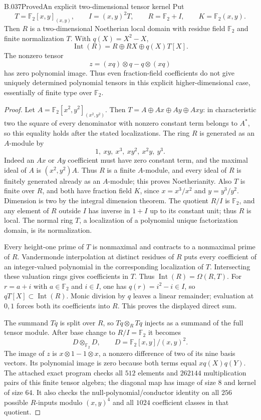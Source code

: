 \begin{saresult}{B.037}{Proved}{An explicit two-dimensional tensor kernel}
Put
\[
 T=\mathbb F_2[x,y]_{(x,y)},\qquad
 I=(x,y)^2T,\qquad R=\mathbb F_2+I,\qquad K=\mathbb F_2(x,y).
\]
Then $R$ is a two-dimensional Noetherian local domain with residue
field $\mathbb F_2$ and finite normalization $T$. With $q(X)=X^2-X$,
\[
 \operatorname{Int}(R)=R\oplus RX\oplus q(X)T[X].
\]
The nonzero tensor
\[
 z=(xq)\otimes q-q\otimes(xq)
\]
has zero polynomial image. Thus even fraction-field coefficients
do not give uniquely determined polynomial tensors in this
explicit higher-dimensional case, essentially of finite type over
$\mathbb F_2$.
\end{saresult}
\begin{proof}
Let $A=\mathbb F_2[x^2,y^2]_{(x^2,y^2)}$. Then
$T=A\oplus Ax\oplus Ay\oplus Axy$: in characteristic two the
square of every denominator with nonzero constant term belongs
to $A^*$, so this equality holds after the stated localizations.
The ring $R$ is generated as an $A$-module by
\[
 1,\ xy,\ x^3,\ xy^2,\ x^2y,\ y^3.
\]
Indeed an $Ax$ or $Ay$ coefficient must have zero constant term,
and the maximal ideal of $A$ is $(x^2,y^2)A$.
Thus $R$ is a finite $A$-module, and every ideal of $R$ is
finitely generated already as an $A$-module; this proves
Noetherianity. Also $T$ is finite over $R$, and both have
fraction field $K$, since $x=x^3/x^2$ and $y=y^3/y^2$.
Dimension is two by the integral dimension theorem.
The quotient $R/I$ is $\mathbb F_2$, and any element of $R$
outside $I$ has inverse in $1+I$ up to its constant unit;
thus $R$ is local. The normal ring $T$, a localization of a
polynomial unique factorization domain, is its normalization.

Every height-one prime of $T$ is nonmaximal and contracts to a
nonmaximal prime of $R$. Vandermonde interpolation at distinct
residues of $R$ puts every coefficient of an integer-valued
polynomial in the corresponding localization of $T$.
Intersecting these valuation rings gives coefficients in $T$.
Thus $\operatorname{Int}(R)=\Omega(R,T)$.
For $r=a+i$ with $a\in\mathbb F_2$ and $i\in I$, one has
$q(r)=i^2-i\in I$, so $qT[X]\subset\operatorname{Int}(R)$.
Monic division by $q$ leaves a linear remainder; evaluation at
$0,1$ forces both its coefficients into $R$. This proves the
displayed direct sum.

The summand $Tq$ is split over $R$, so $Tq\otimes_RTq$ injects
as a summand of the full tensor module. After base change to
$R/I=\mathbb F_2$ it becomes
\[
 D\otimes_{\mathbb F_2}D,
 \qquad D=\mathbb F_2[x,y]/(x,y)^2.
\]
The image of $z$ is $x\otimes1-1\otimes x$, a nonzero difference
of two of its nine basis vectors. Its polynomial image is zero
because both terms equal $xq(X)q(Y)$.
The attached exact program checks all $512$ elements and
$262144$ multiplication pairs of this finite tensor algebra;
the diagonal map has image of size $8$ and kernel of size $64$.
It also checks the null-polynomial/conductor identity on all
$256$ possible $R$-inputs modulo $(x,y)^4$ and all $1024$
coefficient classes in that quotient.
\end{proof}


